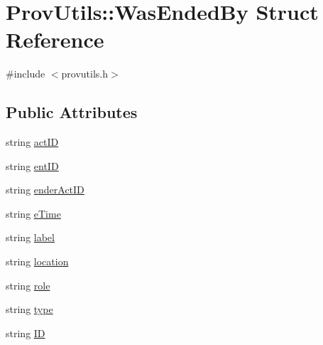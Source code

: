 \hypertarget{struct_prov_utils_1_1_was_ended_by}{\section{Prov\-Utils\-:\-:Was\-Ended\-By Struct Reference}
\label{struct_prov_utils_1_1_was_ended_by}
}


{\ttfamily \#include $<$provutils.\-h$>$}

\subsection*{Public Attributes}
\begin{DoxyCompactItemize}
\item 
string \hyperlink{struct_prov_utils_1_1_was_ended_by_a22c9f7022097e4cd409b02653582a539}{act\-I\-D}
\item 
string \hyperlink{struct_prov_utils_1_1_was_ended_by_a8e083092a08c19da1a4e6e5b64cde20a}{ent\-I\-D}
\item 
string \hyperlink{struct_prov_utils_1_1_was_ended_by_aa44c6bdb89f43facb541bc310ba480a2}{ender\-Act\-I\-D}
\item 
string \hyperlink{struct_prov_utils_1_1_was_ended_by_af536f6636f9f47973d6c54ade6522b5a}{e\-Time}
\item 
string \hyperlink{struct_prov_utils_1_1_was_ended_by_af82ae3d026502438a125dd862c70091e}{label}
\item 
string \hyperlink{struct_prov_utils_1_1_was_ended_by_a9facb5793326c01fb66c0d468f463fe7}{location}
\item 
string \hyperlink{struct_prov_utils_1_1_was_ended_by_a99d83d6c5ec830f2c1fc45d7aa886742}{role}
\item 
string \hyperlink{struct_prov_utils_1_1_was_ended_by_a2b57f65acc219202e111c989a5523188}{type}
\item 
string \hyperlink{struct_prov_utils_1_1_was_ended_by_a09c7891b60eafd8fd5e5fffd567b1a44}{I\-D}
\end{DoxyCompactItemize}


